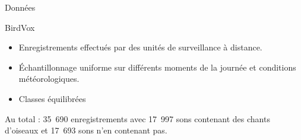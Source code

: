 \documentclass[compress,xcolor=table]{beamer}
\begin{document}
\begin{frame}{Données}

    \begin{block}{BirdVox}
        \begin{itemize}
            \item Enregistrements effectués par des unités de surveillance à distance.
            \item Échantillonnage uniforme sur différents moments de la journée et conditions météorologiques.
            \item Classes équilibrées
        \end{itemize}
    \end{block}

    Au total : 35~690 enregistrements avec 17~997 sons contenant des chants d'oiseaux et 17~693 sons n'en contenant pas.

\end{frame}
\end{document}
